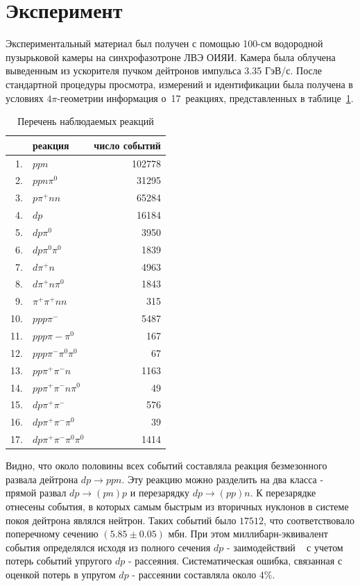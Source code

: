 \documentclass[a4paper,12pt]{article}
\begin{document}
\section{Эксперимент}
Экспериментальный материал был получен с помощью 100-см водородной
пузырьковой камеры на синхрофазотроне ЛВЭ ОИЯИ.  Камера была облучена
выведенным из ускорителя пучком дейтронов импульса 3.35 ГэВ/с. После
стандартной процедуры просмотра, измерений и идентификации была
получена в условиях $4\pi$-геометрии информация о~17~реакциях,
представленных в таблице~\ref{t_channels}.

\begin{table}[!hbp]
  \begin{center}
    \begin{tabular}{|r|l|r|} \hline &реакция&число событий \\ \hline
      1.&$ppn$&102778\\ \hline 2.&$ppn\pi^{0}$&31295 \\ \hline
      3.&$p\pi^{+}nn$&65284 \\ \hline 4.&$dp$&16184\\ \hline
      5.&$dp\pi^{0}$&3950\\ \hline 6.&$dp\pi^{0}\pi^{0}$&1839\\ \hline
      7.&$d\pi^{+}n$&4963\\ \hline 8.&$d\pi^{+}n\pi^{0}$&1843\\ \hline
      9.&$\pi^{+}\pi^{+}nn$&315\\ \hline 10.&$ppp\pi^{-}$&5487\\
      \hline 11.&$ppp\pi{-}\pi^{0}$&167\\ \hline
      12.&$ppp\pi^{-}\pi^{0}\pi^{0}$&67\\ \hline
      13.&$pp\pi^{+}\pi^{-}n$&1163\\ \hline
      14.&$pp\pi^{+}\pi^{-}n\pi^{0}$&49\\ \hline
      15.&$dp\pi^{+}\pi^{-}$&576\\ \hline
      16.&$dp\pi^{+}\pi^{-}\pi^{0}$&39\\ \hline
      17.&$dp\pi^{+}\pi^{-}\pi^{0}\pi^{0}$&1414\\ \hline
    \end{tabular}
    \caption{Перечень наблюдаемых реакций} \label{t_channels}
  \end{center}
\end{table}

Видно, что около половины всех событий составляла реакция безмезонного
развала дейтрона $dp\to ppn$.  Эту реакцию можно разделить на два
класса - прямой развал $dp\to (pn)p$ и перезарядку $dp\to (pp)n$.  К
перезарядке отнесены события, в которых самым быстрым из вторичных
нуклонов в системе покоя дейтрона являлся нейтрон. Таких событий было
$17512$, что соответствовало поперечному сечению $( 5.85 \pm 0.05 )$
мбн. При этом миллибарн-эквивалент события определялся исходя из
полного сечения $dp$ - заимодействий ~\cite{a7} с учетом потерь
событий упругого $dp$ - рассеяния.  Систематическая ошибка, связанная
с оценкой потерь в упругом $dp$ - рассеянии составляла около $4 \%$.
\end{document}
